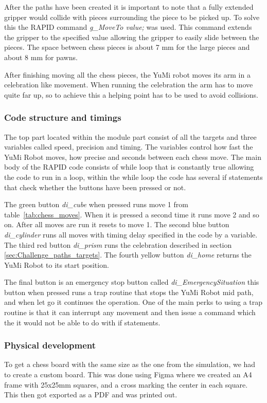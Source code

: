 \documentclass[a4paper,12pt]{article}
\begin{document}
After the paths have been created it is important to note that a fully extended gripper would collide with pieces surrounding the piece to be picked up. To solve this the RAPID command \textit{g\_MoveTo value;} was used. This command extends the gripper to the specified value allowing the gripper to easily slide between the pieces. The space between chess pieces is about 7 mm for the large pieces and about 8 mm for pawns.

After finishing moving all the chess pieces, the YuMi robot moves its arm in a celebration like movement. When running the celebration the arm has to move quite far up, so to achieve this a helping point has to be used to avoid collisions.

\subsubsection{Code structure and timings}
The top part located within the module part consist of all the targets and three variables called speed, precision and timing. The variables control how fast the YuMi Robot moves, how precise and seconds between each  chess move. The main body of the RAPID code consists of while loop that is constantly true allowing the code to run in a loop, within the while loop the code has several if statements that check whether the buttons have been pressed or not. 

The green button \textit{di\_cube} when pressed runs move 1 from table~\ref{tab:chess_moves}. When it is pressed a second time it runs move 2 and so on. After all moves are run it resets to move 1. The second blue button \textit{di\_cylinder} runs all moves with timing delay specified in the code by a variable. The third red button \textit{di\_prism} runs the celebration described in section \ref{sec:Challenge_paths_targets}. The fourth yellow button \textit{di\_home} returns the YuMi Robot to its start position.

The final button is an emergency stop button called \textit{di\_EmergencySituation} this button when pressed runs a trap routine that stops the YuMi Robot mid path, and when let go it continues the operation. One of the main perks to using a trap routine is that it can interrupt any movement and then issue a command which the it would not be able to do with if statements.

\subsubsection{Physical development}
To get a chess board with the same size as the one from the simulation, we had to create a custom board. This was done using Figma where we created an A4 frame with 25x25mm squares, and a cross marking the center in each square. This then got exported as a PDF and was printed out. 
\end{document}
